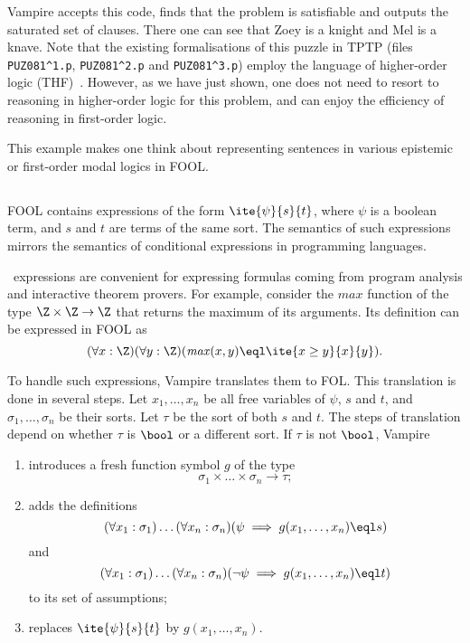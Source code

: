 Vampire accepts this code, finds that the problem is satisfiable and outputs the saturated set of clauses. There one can see that Zoey is a knight and Mel is a knave. Note that the existing formalisations of this puzzle in TPTP (files \verb'PUZ081^1.p', \verb'PUZ081^2.p' and \verb'PUZ081^3.p') employ the language of higher-order logic (THF)~\cite{THF}. However, as we have just shown, one does not need to resort to reasoning in higher-order logic for this problem, and can enjoy the efficiency of reasoning in first-order logic.



This example makes one think about representing sentences in various epistemic or first-order modal logics in FOOL.

\subsection{\ITE}

FOOL contains expressions of the form $\ite{\psi}{s}{t}$, where $\psi$ is a boolean term, and $s$ and $t$ are terms of the same sort. The semantics of such expressions mirrors the semantics of conditional expressions in programming languages.

\ITE\ expressions are convenient for expressing formulas coming from program analysis and interactive theorem provers. For example, consider the $\mathit{max}$ function of the type $\Z \times \Z \to \Z$ that returns the maximum of its arguments. Its definition can be expressed in FOOL as
\begin{equation}\label{eq:ite-t-example}
  (\forall x:\Z)(\forall y:\Z)(\mathit{max}(x, y) \eql \ite{x \geq y}{x}{y}).
\end{equation}

To handle such expressions, Vampire translates them to FOL. This translation is done in several steps. Let $x_1,\ldots,x_n$ be all free variables of $\psi$, $s$ and $t$, and $\sigma_1,\ldots,\sigma_n$ be their sorts. Let $\tau$ be the sort of both $s$ and $t$. The steps of translation depend on whether $\tau$ is $\bool$ or a different sort. If $\tau$ is not $\bool$, Vampire
\begin{enumerate}
  \item introduces a fresh function symbol $g$ of the type $$\sigma_1 \times \ldots \times \sigma_n \to \tau;$$
  \item adds the definitions $$(\forall x_1:\sigma_1)\ldots(\forall x_n:\sigma_n) (\psi \implies g(x_1,\ldots,x_n) \eql s)$$ and $$(\forall x_1:\sigma_1)\ldots(\forall x_n:\sigma_n) (\neg\psi \implies g(x_1,\ldots,x_n) \eql t)$$ to its set of assumptions;
  \item replaces $\ite{\psi}{s}{t}$ by $g(x_1,\ldots,x_n)$.
\end{enumerate}

